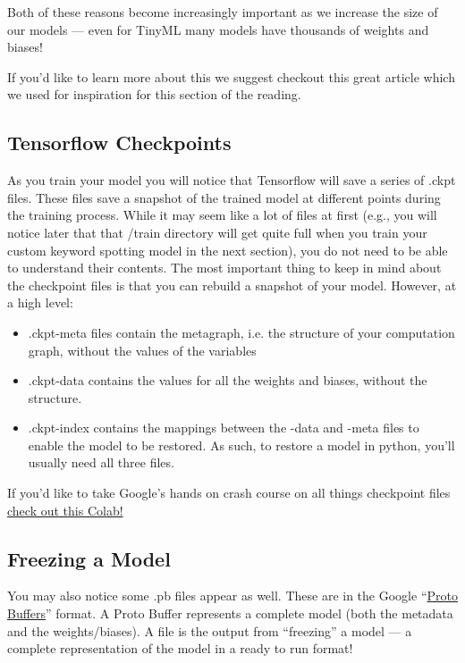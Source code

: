 Both of these reasons become increasingly important as we increase the size of our models --- even for TinyML many models have thousands of weights and biases!

If you'd like to learn more about this we suggest checkout this great article which we used for inspiration for this section of the reading.

\subsection{Tensorflow Checkpoints}

As you train your model you will notice that Tensorflow will save a series of .ckpt files. These files save a snapshot of the trained model at different points during the training process. While it may seem like a lot of files at first (e.g., you will notice later that that /train directory will get quite full when you train your custom keyword spotting model in the next section), you do not need to be able to understand their contents. The most important thing to keep in mind about the checkpoint files is that you can rebuild a snapshot of your model. However, at a high level:

\begin{itemize}
  \item .ckpt-meta files contain the metagraph, i.e. the structure of your computation graph, without the values of the variables
  \item .ckpt-data contains the values for all the weights and biases, without the structure. 
  \item .ckpt-index contains the mappings between the -data and -meta files to enable the model to be restored. As such, to restore a model in python, you'll usually need all three files.
\end{itemize}

If you'd like to take Google’s hands on crash course on all things checkpoint files \href{https://colab.research.google.com/github/tensorflow/docs/blob/master/site/en/guide/checkpoint.ipynb}{check out this Colab!}

\subsection{Freezing a Model}

You may also notice some .pb files appear as well. These are in the Google ``\href{https://developers.google.com/protocol-buffers}{Proto Buffers}'' format. A Proto Buffer represents a complete model (both the metadata and the weights/biases). A  file is the output from ``freezing'' a model --- a complete representation of the model in a ready to run format!

